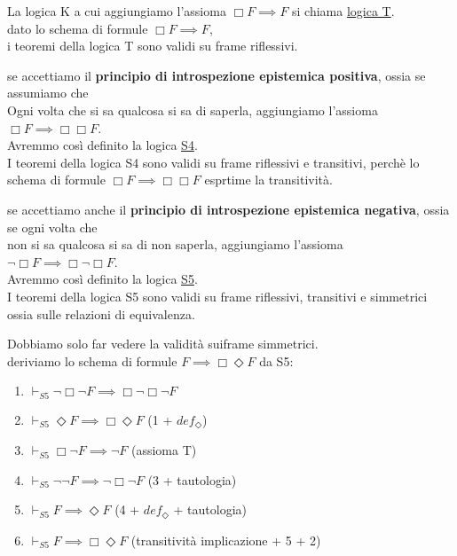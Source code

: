 \documentclass[a4paper,12pt]{article}
\theoremstyle{def}
\theoremstyle{prop}
\theoremstyle{esempio}
\theoremstyle{dimostrazione}
\theoremstyle{teo}
\theoremstyle{osservazione}
\begin{document}
\begin{list}{-}{}
	\item La logica K a cui aggiungiamo l'assioma \(\Box F \implies F\) si chiama \underline{logica T}.\\
	      dato lo schema di formule \(\Box F \implies F\),\\
	      i teoremi della logica T sono validi su frame riflessivi.
	\item se accettiamo il \textbf{principio di introspezione epistemica positiva}, ossia se assumiamo che\\
	      Ogni volta che si sa qualcosa si sa di saperla, aggiungiamo l'assioma \(\Box F \implies \Box \Box F\).\\
	      Avremmo così definito la logica \underline{S4}.\\
	      I teoremi della logica S4 sono validi su frame riflessivi e transitivi, perchè lo schema di formule \(\Box F \implies \Box \Box F\) esprtime la transitività.
	\item se accettiamo anche il \textbf{principio di introspezione epistemica negativa}, ossia se ogni volta che\\
	      non si sa qualcosa si sa di non saperla, aggiungiamo l'assioma \(\neg \Box F \implies \Box \neg \Box F\).\\
	      Avremmo così definito la logica \underline{S5}.\\
	      I teoremi della logica S5 sono validi su frame riflessivi, transitivi e simmetrici ossia sulle relazioni di equivalenza.
\end{list}
Dobbiamo solo far vedere la validità suiframe simmetrici.\\
deriviamo lo schema di formule \(F \implies \Box \Diamond F\) da S5:
\begin{enumerate}
	\item \(\vdash_{S5} \neg \Box \neg F \implies \Box \neg \Box \neg F\)
	\item \(\vdash_{S5} \Diamond F \implies \Box \Diamond F\) (1 + \(def_\Diamond\))
	\item \(\vdash_{S5} \Box \neg F \implies \neg F\) (assioma T)
	\item \(\vdash_{S5} \neg \neg F \implies \neg \Box \neg F\) (3 + tautologia)
	\item \(\vdash_{S5} F \implies \Diamond F\) (4 + \(def_\Diamond\) + tautologia)
	\item \(\vdash_{S5} F \implies \Box \Diamond F\) (transitività implicazione + 5 + 2)
\end{enumerate}
\end{document}
